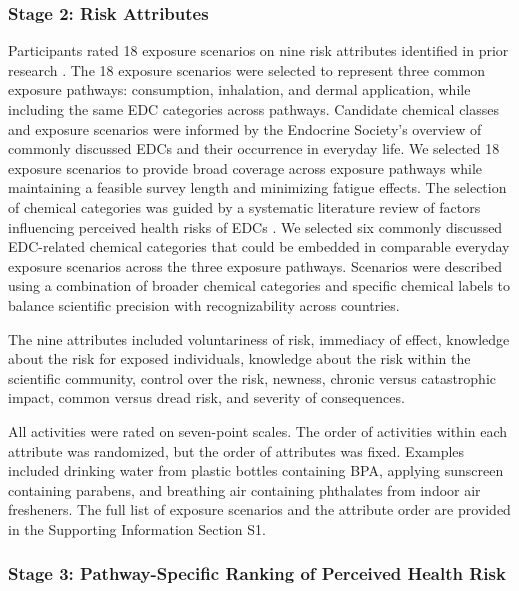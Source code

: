 \subsubsection{Stage 2: Risk Attributes}

Participants rated 18 exposure scenarios on nine risk attributes identified in prior research \citep{fischhoff1978safe}. The 18 exposure scenarios were selected to represent three common exposure pathways: consumption, inhalation, and dermal application, while including the same EDC categories across pathways. Candidate chemical classes and exposure scenarios were informed by the Endocrine Society’s overview \citep{endocrinesociety_common_edcs_nd} of commonly discussed EDCs and their occurrence in everyday life. We selected 18 exposure scenarios to provide broad coverage across exposure pathways while maintaining a feasible survey length and minimizing fatigue effects.
The selection of chemical categories was guided by a systematic literature review of factors influencing perceived health risks of EDCs \citep{pravednikov2024main}. We selected six commonly discussed EDC-related chemical categories that could be embedded in comparable everyday exposure scenarios across the three exposure pathways.
Scenarios were described using a combination of broader chemical categories and specific chemical labels to balance scientific precision with recognizability across countries.

The nine attributes included voluntariness of risk, immediacy of effect, knowledge about the risk for exposed individuals, knowledge about the risk within the scientific community, control over the risk, newness, chronic versus catastrophic impact, common versus dread risk, and severity of consequences.

All activities were rated on seven-point scales. The order of activities within each attribute was randomized, but the order of attributes was fixed. Examples included drinking water from plastic bottles containing BPA, applying sunscreen containing parabens, and breathing air containing phthalates from indoor air fresheners. The full list of exposure scenarios and the attribute order are provided in the Supporting Information Section S1.

\subsubsection{Stage 3: Pathway-Specific Ranking of Perceived Health Risk}

